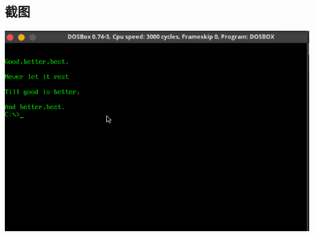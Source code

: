 \documentclass[UTF8,AutoFakeBold,AutoFakeSlant,zihao=-4]{ctexart}
\begin{document}
		\subsection{截图}
				\includegraphics{chapter13.assets/003}
		
\end{document}
